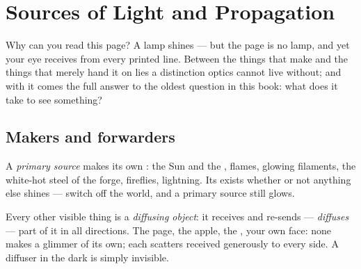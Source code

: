 \chapter{Sources of Light and Propagation}\label{ch:g7:light-sources-propagation}

Why can you read this page? A lamp shines --- but the page is no
lamp, and yet your eye receives  from every printed line.
Between the things that make  and the things that merely
hand it on lies a distinction optics cannot live without; and
with it comes the full answer to the oldest question in this
book: what does it take to see something?

\section{Makers and forwarders}

\begin{definition}\label{def:g7:light-sources-propagation:primary}
A \emph{primary source} makes its own
: the Sun and the , flames, glowing filaments, the
white-hot steel of the forge, fireflies, lightning. Its 
exists whether or not anything else shines --- switch off the
world, and a primary source still glows.
\end{definition}

\begin{definition}\label{def:g7:light-sources-propagation:diffusion}
Every other visible thing is a \emph{diffusing
object}: it receives  and re-sends ---
\emph{diffuses} --- part of it in all directions. The page, the
apple, the , your own face: none makes a glimmer of its own;
each scatters received  generously to every side. A
diffuser in the dark is simply invisible.
\end{definition}

